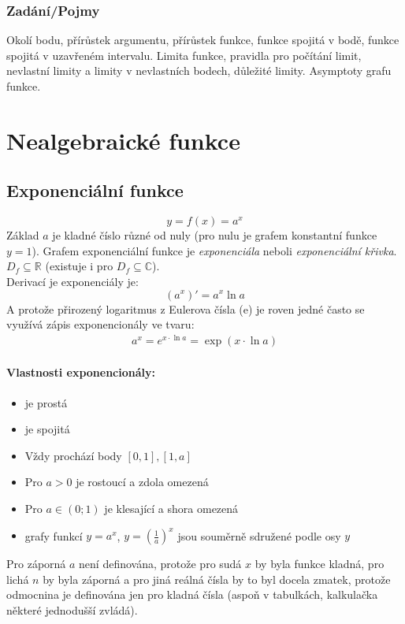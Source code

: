 \documentclass[12pt]{article}
\newcommand{\euler}{\mathrm{e}} %
\newcommand{\nR}{\mathbb{R}} %
\newcommand{\nC}{\mathbb{C}} %
\begin{document}
\subsubsection{Zadání/Pojmy}
Okolí bodu, přírůstek argumentu, přírůstek funkce, funkce spojitá v bodě, funkce spojitá v uzavřeném intervalu. Limita funkce, pravidla pro počítání limit, nevlastní limity a limity v nevlastních bodech, důležité limity. Asymptoty grafu funkce.

\section{Nealgebraické funkce}
\subsection{Exponenciální funkce}
\begin{equation}
y =f(x) = a^x
\end{equation}
Základ $a$ je kladné číslo různé od nuly (pro nulu je grafem konstantní funkce $y=1$). Grafem exponenciální funkce je \emph{exponenciála} neboli \emph{exponenciální křivka}. $D_f \subseteq \nR$ (existuje i pro $D_f \subseteq \nC$).\\
Derivací je exponenciály je:
\begin{equation}
(a^x)' = a^x \ln a
\end{equation}
A protože přirozený logaritmus z Eulerova čísla ($\euler$) je roven jedné často se využívá zápis exponencionály ve tvaru:
\begin{align}
a^x = e^{x \cdot \ln{a}} = \exp{(x \cdot \ln{a})}
\end{align}
\paragraph{Vlastnosti exponencionály:}
\begin{itemize}
\item je prostá
\item je spojitá
\item Vždy prochází body $[0,1], [1,a]$
\item Pro $a>0$ je rostoucí a zdola omezená
\item Pro $a \in (0;1)$ je klesající a shora omezená
\item grafy funkcí $y=a^x$, $y= \left( \frac{1}{a} \right)^{x}$ jsou souměrně sdružené podle osy $y$
\end{itemize}
Pro záporná $a$ není definována, protože pro sudá $x$ by byla funkce kladná, pro lichá $n$ by byla záporná a pro jiná reálná čísla by to byl docela zmatek, protože odmocnina je definována jen pro kladná čísla (aspoň v tabulkách, kalkulačka některé jednodušší zvládá).
\end{document}

